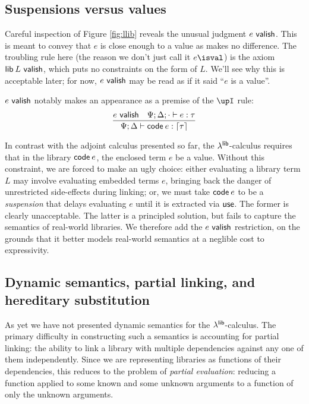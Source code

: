\documentclass[11pt]{article}
\begin{document}

\subsection{Suspensions versus values}

Careful inspection of Figure \ref{fig:llib} reveals the unusual judgment $e
~\textsf{valish}$. This is meant to convey that $e$ is close enough to a value as makes
no difference. The troubling rule here (the reason we don't just call it $e
\isval$) is the axiom $\textsf{lib}\:{L} ~\textsf{valish}$, which puts no constraints on the form
of $L$. We'll see why this is acceptable later; for now, $e ~\textsf{valish}$ may be read
as if it said ``$e$ is a value''.

$e ~\textsf{valish}$ notably makes an appearance as a premise of the $\upI$ rule:
\[
\infer{\Psi;\D \ent \code{e} \isa \up{\tau}}{
  e \valish &
  \Psi;\D;\ecx \ent e \isa \tau}
\]

In contrast with the adjoint calculus presented so far, the $\lambda^{\textsf{lib}}$-calculus
requires that in the library $\textsf{code}\:{e}$, the enclosed term $e$ be a value.
Without this constraint, we are forced to make an ugly choice: either evaluating
a library term $L$ may involve evaluating embedded terms $e$, bringing back the
danger of unrestricted side-effects during linking; or, we must take $\textsf{code}\:{e}$
to be a \emph{suspension} that delays evaluating $e$ until it is extracted
via $\textsf{use}$. The former is clearly unacceptable. The latter is a principled
solution, but fails to capture the semantics of real-world libraries. We
therefore add the $e ~\textsf{valish}$ restriction, on the grounds that it better models
real-world semantics at a neglible cost to expressivity.


\subsection{Dynamic semantics, partial linking, and hereditary substitution}

As yet we have not presented dynamic semantics for the $\lambda^{\textsf{lib}}$-calculus. The
primary difficulty in constructing such a semantics is accounting for partial
linking: the ability to link a library with multiple dependencies against any
one of them independently. Since we are representing libraries as functions of
their dependencies, this reduces to the problem of \emph{partial evaluation}:
reducing a function applied to some known and some unknown arguments to a
function of only the unknown arguments.
\end{document}
